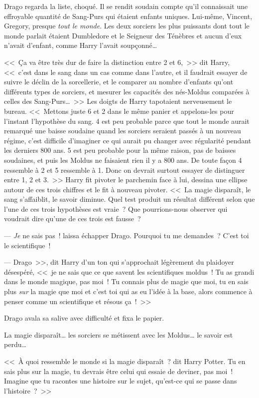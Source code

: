 Drago regarda la liste, choqué. Il se rendit soudain compte qu'il connaissait une effroyable quantité de Sang-Purs qui étaient enfants uniques. Lui-même, Vincent, Gregory, presque \emph{tout le monde}. Les deux sorciers les plus puissants dont tout le monde parlait étaient Dumbledore et le Seigneur des Ténèbres et aucun d'eux n'avait d'enfant, comme Harry l'avait soupçonné…

<<~Ça va être très dur de faire la distinction entre 2 et 6,~>> dit Harry, <<~c'est dans le sang dans un cas comme dans l'autre, et il faudrait essayer de suivre le déclin de la sorcellerie, et le comparer au nombre d'enfants qu'ont différents types de sorciers, et mesurer les capacités des nés-Moldus comparées à celles des Sang-Purs…~>> Les doigts de Harry tapotaient nerveusement le bureau. <<~Mettons juste 6 et 2 dans le même panier et appelons-les pour l'instant l'hypothèse du sang. 4 est peu probable parce que tout le monde aurait remarqué une baisse soudaine quand les sorciers seraient passés à un nouveau régime, c'est difficile d'imaginer ce qui aurait pu changer avec régularité pendant les derniers 800 ans. 5 est peu probable pour la même raison, pas de baisses soudaines, et puis les Moldus ne faisaient rien il y a 800 ans. De toute façon 4 ressemble à 2 et 5 ressemble à 1. Donc on devrait surtout essayer de distinguer entre 1, 2 et 3.~>> Harry fit pivoter le parchemin face à lui, dessina une ellipse autour de ces trois chiffres et le fit à nouveau pivoter. <<~La magie disparaît, le sang s'affaiblit, le savoir diminue. Quel test produit un résultat différent selon que l'une de ces trois hypothèses est vraie~? Que pourrions-nous observer qui voudrait dire qu'une de ces trois est fausse~?

--- \emph{Je} ne sais pas~! laissa échapper Drago. Pourquoi tu me demandes~? C'est toi le scientifique~!

--- Drago~>>, dit Harry d'un ton qui s'approchait légèrement du plaidoyer désespéré, <<~je ne sais que ce que savent les scientifiques moldus~! Tu as grandi dans le monde magique, pas moi~! Tu connais plus de magie que moi, tu en sais plus \emph{sur} la magie que moi et c'est toi qui as eu l'idée à la base, alors commence à penser comme un scientifique et résous ça~!~>>

Drago avala sa salive avec difficulté et fixa le papier.

La magie disparaît… les sorciers se métissent avec les Moldus… le savoir est perdu…

<<~À quoi ressemble le monde si la magie disparaît~? dit Harry Potter. Tu en sais plus sur la magie, tu devrais être celui qui essaie de deviner, pas moi~! Imagine que tu racontes une histoire sur le sujet, qu'est-ce qui se passe dans l'histoire~?~>>

